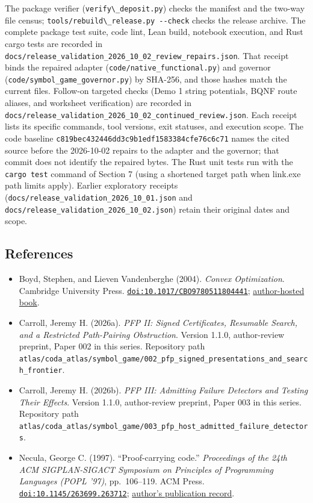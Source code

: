 \documentclass[
  11pt,
]{article}
\newcommand{\passthrough}[1]{#1}
\providecommand{\tightlist}{%
  \setlength{\itemsep}{0pt}\setlength{\parskip}{0pt}}
\begin{document}
The package verifier (\passthrough{\lstinline!verify\_deposit.py!})
checks the manifest and the two-way file census;
\passthrough{\lstinline!tools/rebuild\_release.py --check!} checks the
release archive. The complete package test suite, code lint, Lean build,
notebook execution, and Rust cargo tests are recorded in
\nolinkurl{docs/release_validation_2026_10_02_review_repairs.json}. That
receipt binds the repaired adapter
(\nolinkurl{code/native_functional.py}) and governor
(\nolinkurl{code/symbol_game_governor.py}) by SHA-256, and those hashes
match the current files. Follow-on targeted checks (Demo 1 string
potentials, BQNF route aliases, and worksheet verification) are recorded
in \nolinkurl{docs/release_validation_2026_10_02_continued_review.json}.
Each receipt lists its specific commands, tool versions, exit statuses,
and execution scope. The code baseline
\nolinkurl{c819bec432446dd3c9b1edf1583384cfe76c6c71} names the cited
source before the 2026-10-02 repairs to the adapter and the governor;
that commit does not identify the repaired bytes. The Rust unit tests
run with the \passthrough{\lstinline!cargo test!} command of Section 7
(using a shortened target path when link.exe path limits apply). Earlier
exploratory receipts
(\nolinkurl{docs/release_validation_2026_10_01.json} and
\nolinkurl{docs/release_validation_2026_10_02.json}) retain their
original dates and scope.

\subsection{References}\label{references}

\begin{itemize}
\tightlist
\item
  Boyd, Stephen, and Lieven Vandenberghe (2004). \emph{Convex
  Optimization}. Cambridge University Press.
  \href{https://doi.org/10.1017/CBO9780511804441}{\nolinkurl{doi:10.1017/CBO9780511804441}};
  \href{https://web.stanford.edu/~boyd/cvxbook/}{author-hosted book}.
\item
  Carroll, Jeremy H. (2026a). \emph{PFP II: Signed Certificates,
  Resumable Search, and a Restricted Path-Pairing Obstruction}. Version
  1.1.0, author-review preprint, Paper 002 in this series. Repository
  path
  \nolinkurl{atlas/coda_atlas/symbol_game/002_pfp_signed_presentations_and_search_frontier}.
\item
  Carroll, Jeremy H. (2026b). \emph{PFP III: Admitting Failure Detectors
  and Testing Their Effects}. Version 1.1.0, author-review preprint,
  Paper 003 in this series. Repository path
  \nolinkurl{atlas/coda_atlas/symbol_game/003_pfp_host_admitted_failure_detectors}.
\item
  Necula, George C. (1997). ``Proof-carrying code.'' \emph{Proceedings
  of the 24th ACM SIGPLAN-SIGACT Symposium on Principles of Programming
  Languages (POPL '97)}, pp.~106--119. ACM Press.
  \href{https://doi.org/10.1145/263699.263712}{\nolinkurl{doi:10.1145/263699.263712}};
  \href{https://people.eecs.berkeley.edu/~necula/papers.html}{author's
  publication record}.
\end{itemize}
\end{document}
